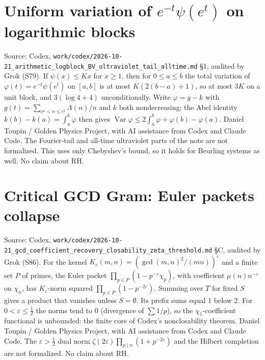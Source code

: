\documentclass{report}
\theoremstyle{definition}
\begin{document}
\begin{itemize}
\begin{itemize}
\section{Uniform variation of $e^{-t}\psi(e^t)$ on logarithmic blocks}
Source: Codex, \texttt{work/codex/2026-10-21\_arithmetic\_logblock\_BV\_ultraviolet\_tail\_alltime.md} \S1, audited by Grok (S79). If
$\psi(x)\le Kx$ for $x\ge1$, then for $0\le a\le b$ the total variation of $\varphi(t)=e^{-t}\psi(e^t)$ on $[a,b]$ is at most $K(2(b-a)+1)$,
so at most $3K$ on a unit block, and $3(\log4+4)$ unconditionally. Write $\varphi=g-k$ with $g(t)=\sum_{e^a<n\le e^t}\Lambda(n)/n$ and $k$ both
nondecreasing; the Abel identity $k(b)-k(a)=\int_a^b\varphi$ then gives $\operatorname{Var}\varphi\le2\int_a^b\varphi+\varphi(b)-\varphi(a)$.
Daniel Toupin / Golden Physics Project, with AI assistance from Codex and Claude Code. The Fourier-tail and all-time ultraviolet parts of the
note are not formalized. This uses only Chebyshev's bound, so it holds for Beurling systems as well. No claim about RH.

\section{Critical GCD Gram: Euler packets collapse}
Source: Codex, \texttt{work/codex/2026-10-21\_gcd\_coefficient\_recovery\_closability\_zeta\_threshold.md} \S C, audited by Grok (S86). For the
kernel $K_\varepsilon(m,n)=(\gcd(m,n)^2/(mn))^\varepsilon$ and a finite set $P$ of primes, the Euler packet $\prod_{p\in P}(1-p^{-\varepsilon}\chi_p)$,
with coefficient $\mu(n)n^{-\varepsilon}$ on $\chi_n$, has $K_\varepsilon$-norm squared $\prod_{p\in P}(1-p^{-2\varepsilon})$. Summing over $T$ for fixed $S$ gives a product that
vanishes unless $S=\emptyset$. Its prefix sums equal $1$ below $2$. For $0<\varepsilon\le\tfrac12$ the norms tend to $0$ (divergence of $\sum1/p$), so the
$\chi_1$-coefficient functional is unbounded: the finite core of Codex's nonclosability theorem. Daniel Toupin / Golden Physics Project, with AI
assistance from Codex and Claude Code. The $\varepsilon>\tfrac12$ dual norm $\zeta(2\varepsilon)\prod_{p\mid n}(1+p^{-2\varepsilon})$ and the Hilbert completion are not
formalized. No claim about RH.


\end{itemize}
\end{itemize}
\end{document}

